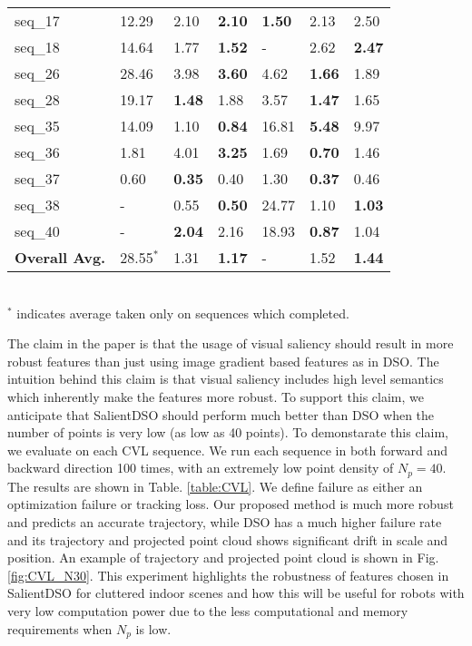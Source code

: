 \documentclass[letterpaper, 10 pt, conference]{ieeeconf}  %
\begin{document}
\begin{table}[]
{\begin{tabular}{lllllll}
seq\_17 & 12.29    & 2.10 & \textbf{2.10}      & \textbf{1.50}     & 2.13 & 2.50           \\
seq\_18 & 14.64    & 1.77 & \textbf{1.52}      & -        & 2.62 & \textbf{2.47}           \\
seq\_26 & 28.46    & 3.98 & \textbf{3.60}      & 4.62     & \textbf{1.66} & 1.89           \\
seq\_28 & 19.17    & \textbf{1.48} & 1.88      & 3.57     & \textbf{1.47} & 1.65           \\
seq\_35 & 14.09    & 1.10 & \textbf{0.84}      & 16.81    & \textbf{5.48} & 9.97           \\
seq\_36 & 1.81     & 4.01 & \textbf{3.25}      & 1.69     & \textbf{0.70} & 1.46           \\
seq\_37 & 0.60     & \textbf{0.35} & 0.40      & 1.30     & \textbf{0.37} & 0.46           \\
seq\_38 & -        & 0.55 & \textbf{0.50}      & 24.77    & 1.10 & \textbf{1.03}           \\
seq\_40 & -        & \textbf{2.04} & 2.16      & 18.93    & \textbf{0.87} & 1.04           \\
\hline 
\textbf{Overall Avg.} & 28.55$^*$        & 1.31 & \textbf{1.17}      & -        & 1.52 & \textbf{1.44} \\
\bottomrule
\end{tabular}}
  \\\scriptsize{$^*$ indicates average taken only on sequences which completed.}
\end{table}

The claim in the paper is that the usage of visual saliency should result in more robust features than just using image gradient based features as in DSO. The intuition behind this claim is that visual saliency includes high level semantics which inherently make the features more robust. To support this claim, we anticipate that SalientDSO should perform much better than DSO when the number of points is very low (as low as 40 points). To demonstarate this claim, we evaluate on each CVL sequence. We run each sequence in both forward and backward direction 100 times, with an extremely low point density of $N_{p} = 40$. The results are shown in Table. \ref{table:CVL}. We define failure as either an optimization failure or tracking loss. Our proposed method is much more robust and predicts an accurate trajectory, while DSO has a much higher failure rate and its trajectory and projected point cloud shows significant drift in scale and position. An example of trajectory and projected point cloud is shown in Fig. \ref{fig:CVL_N30}. This experiment highlights the robustness of features chosen in SalientDSO for cluttered indoor scenes and how this will be useful for robots with very low computation power due to the less computational and memory requirements when $N_p$ is low.
\end{document}
